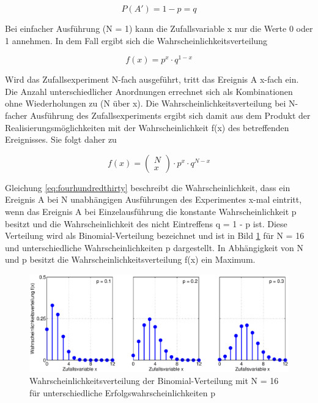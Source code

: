 \begin{equation}\label{eq:fourhundredtwentyeight}
P(A')=1-p=q
\end{equation}

\noindent Bei einfacher Ausf\"{u}hrung (N = 1) kann die Zufallsvariable x nur die Werte 0 oder 1 annehmen. In dem Fall ergibt sich die Wahrscheinlichkeitsverteilung 

\begin{equation}\label{eq:fourhundredtwentynine}
f(x)=p^{x} \cdot q^{1-x}
\end{equation}

\noindent Wird das Zufallsexperiment N-fach ausgef\"{u}hrt, tritt das Ereignis A x-fach ein. Die Anzahl unterschiedlicher Anordnungen errechnet sich als Kombinationen ohne Wiederholungen zu (N \"{u}ber x). Die Wahrscheinlichkeitsverteilung bei N-facher Ausf\"{u}hrung des Zufallsexperiments ergibt sich damit aus dem Produkt der Realisierungsm\"{o}glichkeiten mit der Wahrscheinlichkeit f(x) des betreffenden Ereignisses. Sie folgt daher zu

\begin{equation}\label{eq:fourhundredthirty}
f(x)=\left(\begin{array}{l} {N} \\ 
{x} \end{array}\right)\cdot p^{x} \cdot q^{N-x}
\end{equation}

\noindent Gleichung \eqref{eq:fourhundredthirty} beschreibt die Wahrscheinlichkeit, dass ein Ereignis A bei N unabh\"{a}ngigen Ausf\"{u}hrungen des Experimentes x-mal eintritt, wenn das Ereignis A bei Einzelausf\"{u}hrung die konstante Wahrscheinlichkeit p besitzt und die Wahrscheinlichkeit des nicht Eintreffens q = 1 - p ist. Diese Verteilung wird als Binomial-Verteilung bezeichnet und ist in Bild \ref{fig:Diskret_Binomial1} f\"{u}r N = 16 und unterschiedliche Wahrscheinlichkeiten p dargestellt. In Abh\"{a}ngigkeit von N und p besitzt die Wahrscheinlichkeitsverteilung f(x) ein Maximum.

\clearpage

\noindent 
\begin{figure}[H]
  \centerline{\includegraphics[width=1\textwidth]{Kapitel4/Bilder/image12}}
  \caption{Wahrscheinlichkeitsverteilung der Binomial-Verteilung mit N = 16 f\"{u}r unterschiedliche Erfolgswahrscheinlichkeiten p}
  \label{fig:Diskret_Binomial1}
\end{figure}

